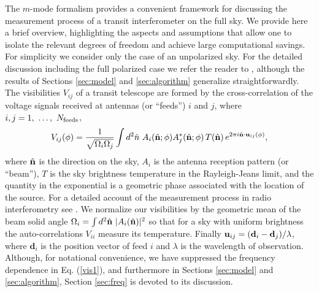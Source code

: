 The $m$-mode formalism provides a convenient framework for discussing the measurement process of a transit interferometer on the full sky. We provide here a brief overview, highlighting the aspects and assumptions that allow one to isolate the relevant degrees of freedom and achieve large computational savings. For simplicity we consider only the case of an unpolarized sky. For the detailed discussion including the full polarized case we refer the reader to \cite{mmodes2}, although the results of Sections \ref{sec:model} and \ref{sec:algorithm} generalize straightforwardly. The visibilities $V_{ij}$ of a transit telescope are formed by the cross-correlation of the voltage signals received at antennas (or ``feeds'') $i$ and $j$, where $i,j=1,~\dots,~N_{\rm feeds}$,
\begin{equation}
V_{ij}(\phi) = \frac{1}{\sqrt{\Omega_{i}\Omega_{j}}} \int d^2\hat{n} ~ A_i(\hat{\mathbf{n}}; \phi) A^*_j(\hat{\mathbf{n}}; \phi) \, T(\hat{\mathbf{n}}) \, e^{2\pi i\hat{\mathbf{n}} \cdot \mathbf{u}_{ij}(\phi)},
\label{vis1}
\end{equation}
 where $\hat{\mathbf{n}}$ is the direction on the sky, $A_i$ is the antenna reception pattern (or ``beam''), $T$ is the sky brightness temperature in the Rayleigh-Jeans limit, and the quantity in the exponential is a geometric phase associated with the location of the source. For a detailed account of the measurement process in radio interferometry see \cite{radio1}. We normalize our visibilities by the geometric mean of the beam solid angle $\Omega_i =\int d^2\hat{\mathbf{n}}~|A_i({\hat{\mathbf{n}}})|^2$ so that for a sky with uniform brightness the auto-correlations $V_{ii}$ measure its temperature. Finally ${\bf u}_{ij} = (\mathbf{d}_{i} - \mathbf{d}_{j})/\lambda$, where $\mathbf{d}_{i}$ is the position vector of feed $i$ and $\lambda$ is the wavelength of observation. Although, for notational convenience, we have suppressed the frequency dependence in Eq. (\ref{vis1}), and furthermore in Sections \ref{sec:model} and \ref{sec:algorithm}, Section \ref{sec:freq} is devoted to its discussion.

